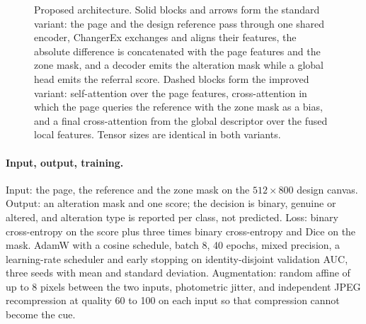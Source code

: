 \documentclass[11pt,a4paper]{article}
\begin{document}
\begin{figure}[H]
{}
\caption{Proposed architecture. Solid blocks and arrows form the standard variant: the page and the design reference pass through one shared encoder, ChangerEx exchanges and aligns their features, the absolute difference is concatenated with the page features and the zone mask, and a decoder emits the alteration mask while a global head emits the referral score. Dashed blocks form the improved variant: self-attention over the page features, cross-attention in which the page queries the reference with the zone mask as a bias, and a final cross-attention from the global descriptor over the fused local features. Tensor sizes are identical in both variants.}
\label{fig:arch}
\end{figure}

\paragraph{Input, output, training.} Input: the page, the reference and the zone mask on the $512 \times 800$ design canvas. Output: an alteration mask and one score; the decision is binary, genuine or altered, and alteration type is reported per class, not predicted. Loss: binary cross-entropy on the score plus three times binary cross-entropy and Dice on the mask. AdamW with a cosine schedule, batch 8, 40 epochs, mixed precision, a learning-rate scheduler and early stopping on identity-disjoint validation AUC, three seeds with mean and standard deviation. Augmentation: random affine of up to 8 pixels between the two inputs, photometric jitter, and independent JPEG recompression at quality 60 to 100 on each input so that compression cannot become the cue.
\end{document}

